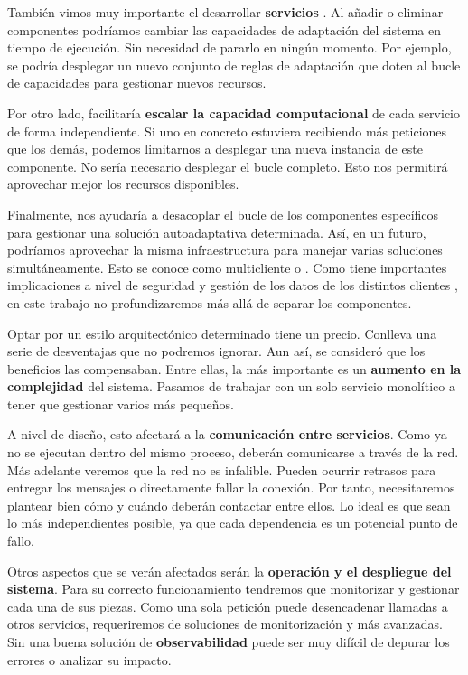 También vimos muy importante el desarrollar \textbf{servicios }. Al añadir o eliminar componentes podríamos cambiar las capacidades de adaptación del sistema en tiempo de ejecución. Sin necesidad de pararlo en ningún momento. Por ejemplo, se podría desplegar un nuevo conjunto de reglas de adaptación que doten al bucle de capacidades para gestionar nuevos recursos.

Por otro lado, facilitaría \textbf{escalar la capacidad computacional} de cada servicio de forma independiente. Si uno en concreto estuviera recibiendo más peticiones que los demás, podemos limitarnos a desplegar una nueva instancia de este componente. No sería necesario desplegar el bucle completo. Esto nos permitirá aprovechar mejor los recursos disponibles.

Finalmente, nos ayudaría a desacoplar el bucle de los componentes específicos para gestionar una solución autoadaptativa determinada. Así, en un futuro, podríamos aprovechar la misma infraestructura para manejar varias soluciones simultáneamente. Esto se conoce como multicliente o \textbf{}. Como tiene importantes implicaciones a nivel de seguridad y gestión de los datos de los distintos clientes \cite{aljahdaliMultitenancyCloudComputing2014}, en este trabajo no profundizaremos más allá de separar los componentes.

Optar por un estilo arquitectónico determinado tiene un precio. Conlleva una serie de desventajas que no podremos ignorar. Aun así, se consideró que los beneficios las compensaban. Entre ellas, la más importante es un \textbf{aumento en la complejidad} del sistema. \cite{newmanBuildingMicroservicesDesigning2021} Pasamos de trabajar con un solo servicio monolítico a tener que gestionar varios más pequeños.

A nivel de diseño, esto afectará a la \textbf{comunicación entre servicios}. Como ya no se ejecutan dentro del mismo proceso, deberán comunicarse a través de la red. Más adelante veremos que la red no es infalible. \cite{jausovecFallaciesDistributedSystems2020} Pueden ocurrir retrasos para entregar los mensajes o directamente fallar la conexión. Por tanto, necesitaremos plantear bien cómo y cuándo deberán contactar entre ellos. Lo ideal es que sean lo más independientes posible, ya que cada dependencia es un potencial punto de fallo.

Otros aspectos que se verán afectados serán la \textbf{operación y el despliegue del sistema}. Para su correcto funcionamiento tendremos que monitorizar y gestionar cada una de sus piezas. Como una sola petición puede desencadenar llamadas a otros servicios, requeriremos de soluciones de monitorización y  más avanzadas. \cite{parkerProblemDistributedTracing2020} Sin una buena solución de \textbf{observabilidad} puede ser muy difícil de depurar los errores o analizar su impacto.

